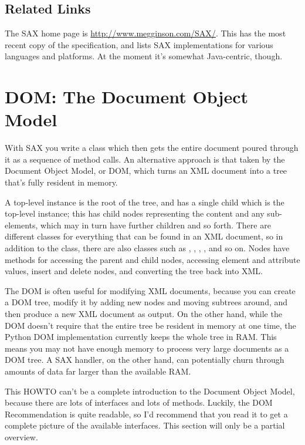 \documentclass{howto}
\begin{document}
\subsection{Related Links}

The SAX home page is \url{http://www.megginson.com/SAX/}.  This has
the most recent copy of the specification, and lists SAX
implementations for various languages and platforms.  At the moment
it's somewhat Java-centric, though.


\section{DOM: The Document Object Model}
\label{section-DOM}

With SAX you write a class which then gets the entire document poured
through it as a sequence of method calls.  An alternative approach is
that taken by the Document Object Model, or DOM, which turns an XML
document into a tree that's fully resident in memory.  

A top-level  instance is the root of the tree, and has
a single child which is the top-level  instance; this
 has child nodes representing the content and any
sub-elements, which may in turn have further children and so forth.
There are different classes for everything that can be found in an XML
document, so in addition to the  class, there are also
classes such as , , ,
, and so on.  Nodes have methods for
accessing the parent and child nodes, accessing element and attribute
values, insert and delete nodes, and converting the tree back into XML.

The DOM is often useful for modifying XML documents, because you can
create a DOM tree, modify it by adding new nodes and moving subtrees
around, and then produce a new XML document as output.  On the other
hand, while the DOM doesn't require that the entire tree be resident
in memory at one time, the Python DOM implementation currently keeps
the whole tree in RAM.  This means you may not have enough memory to
process very large documents as a DOM tree.  A SAX handler, on the
other hand, can potentially churn through amounts of data far larger
than the available RAM.

This HOWTO can't be a complete introduction to the Document Object
Model, because there are lots of interfaces and lots of
methods. Luckily, the DOM Recommendation is quite readable, so I'd
recommend that you read it to get a complete picture of the available
interfaces.  This section will only be a partial overview.
\end{document}
